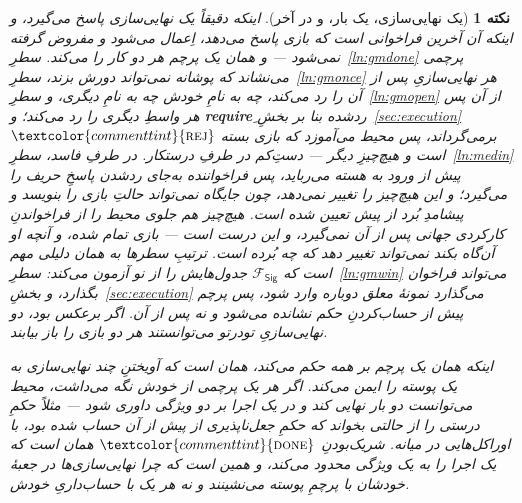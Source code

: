 \documentclass[10pt,oneside,openany]{book}
\newcommand{\op}[1]{\textnormal{\textsc{#1}}}
\newcommand{\atom}[1]{\textcolor{commenttint}{\op{#1}}}
\newcommand{\rej}{\atom{rej}}
\newcommand{\done}{\atom{done}}
\newcommand{\Fsig}{\mathcal{F}_{\mathsf{Sig}}}
\theoremstyle{accentdef}
\newtheorem{remark}[definition]{نکته}
\theoremstyle{accentplain}
\begin{document}
\begin{remark}[یک نهایی‌سازی، یک بار، و در آخر]\label{rem:gmonce}
اینکه دقیقاً یک نهایی‌سازی پاسخ می‌گیرد، و اینکه آن آخرین فراخوانی است که
بازی پاسخ می‌دهد، اِعمال می‌شود و مفروض گرفته نمی‌شود --- و همان یک پرچم هر
دو کار را می‌کند. سطرِ~\ref{ln:gmdone} پرچمی می‌نشاند که پوشانه نمی‌تواند
دورش بزند، سطرِ~\ref{ln:gmonce} هر نهایی‌سازیِ پس از آن را رد می‌کند، چه به
نامِ خودش چه به نامِ دیگری، و سطرِ~\ref{ln:gmopen} از آن پس هر واسطِ دیگری
را رد می‌کند؛ و \textbf{require}ِ ردشده بنا بر بخشِ~\ref{sec:execution}
$\rej$ برمی‌گرداند، پس محیط می‌آموزد که بازی بسته است و هیچ‌چیزِ دیگر ---
دستِ‌کم در طرفِ درستکار. در طرفِ فاسد، سطرِ~\ref{ln:medin} پیش از ورود به
هسته می‌رباید، پس فراخواننده به‌جای رد‌شدن پاسخِ حریف را می‌گیرد؛ و این
هیچ‌چیز را تغییر نمی‌دهد، چون جایگاه نمی‌تواند حالتِ بازی را بنویسد و
پیشامدِ بُرد از پیش تعیین شده است. هیچ‌چیز هم جلوی محیط را از فراخواندنِ
کارکردی جهانی پس از آن نمی‌گیرد، و این درست است --- بازی تمام شده، و آنچه
او آن‌گاه بکند نمی‌تواند تغییر دهد که چه بُرده است. ترتیبِ سطرها به همان
دلیلی مهم است که $\Fsig$ جدول‌هایش را از نو آزمون می‌کند:
سطرِ~\ref{ln:gmwin} می‌تواند فراخوان بگذارد، و بخشِ~\ref{sec:execution}
می‌گذارد نمونهٔ معلق دوباره وارد شود، پس پرچم پیش از حساب‌کردنِ حکم نشانده
می‌شود و نه پس از آن. اگر برعکس بود، دو نهایی‌سازیِ تو‌درتو می‌توانستند هر
دو بازی را باز بیابند.

اینکه همان یک پرچم بر همه حکم می‌کند، همان است که آویختنِ چند نهایی‌سازی
به یک پوسته را ایمن می‌کند. اگر هر یک پرچمی از خودش نگه می‌داشت، محیط
می‌توانست دو بار نهایی کند و در یک اجرا بر دو ویژگی داوری شود --- مثلاً
حکمِ درستی را از حالتی بخواند که حکمِ جعل‌ناپذیری از پیش از آن حساب شده
بود، با اوراکل‌هایی در میانه. شریک‌بودنِ $\done$ همان است که یک اجرا را به
یک ویژگی محدود می‌کند، و همین است که چرا نهایی‌سازی‌ها در جعبهٔ خودشان با
پرچمِ پوسته می‌نشینند و نه هر یک با حساب‌داریِ خودش.
\end{remark}
\end{document}
